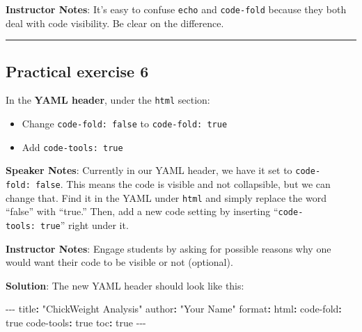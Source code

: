 \documentclass[
  letterpaper,
  DIV=11,
  numbers=noendperiod]{scrartcl}
\newenvironment{Shaded}{\begin{snugshade}}{\end{snugshade}}
\newcommand{\AttributeTok}[1]{\textcolor[rgb]{0.40,0.45,0.13}{#1}}
\newcommand{\CharTok}[1]{\textcolor[rgb]{0.13,0.47,0.30}{#1}}
\newcommand{\FunctionTok}[1]{\textcolor[rgb]{0.28,0.35,0.67}{#1}}
\newcommand{\KeywordTok}[1]{\textcolor[rgb]{0.00,0.23,0.31}{\textbf{#1}}}
\newcommand{\PreprocessorTok}[1]{\textcolor[rgb]{0.68,0.00,0.00}{#1}}
\newcommand{\StringTok}[1]{\textcolor[rgb]{0.13,0.47,0.30}{#1}}
\providecommand{\tightlist}{%
  \setlength{\itemsep}{0pt}\setlength{\parskip}{0pt}}
\begin{document}
\textbf{Instructor Notes}: It's easy to confuse \texttt{echo} and
\texttt{code-fold} because they both deal with code visibility. Be clear
on the difference.

\begin{center}\rule{0.5\linewidth}{0.5pt}\end{center}

\subsection{Practical exercise 6}\label{practical-exercise-6}

In the \textbf{YAML header}, under the \texttt{html} section:

\begin{itemize}
\tightlist
\item[$\square$]
  Change \texttt{code-fold:\ false} to \texttt{code-fold:\ true}
\item[$\square$]
  Add \texttt{code-tools:\ true}
\end{itemize}

\textbf{Speaker Notes}: Currently in our YAML header, we have it set to
\texttt{code-fold:\ false}. This means the code is visible and not
collapsible, but we can change that. Find it in the YAML under
\texttt{html} and simply replace the word ``false'' with ``true.'' Then,
add a new code setting by inserting ``\texttt{code-tools:\ true}'' right
under it.

\textbf{Instructor Notes}: Engage students by asking for possible
reasons why one would want their code to be visible or not (optional).

\textbf{Solution}: The new YAML header should look like this:

\begin{Shaded}
\begin{Highlighting}[]
\PreprocessorTok{{-}{-}{-}}
\FunctionTok{title}\KeywordTok{:}\AttributeTok{ }\StringTok{"ChickWeight Analysis"}
\FunctionTok{author}\KeywordTok{:}\AttributeTok{ }\StringTok{"Your Name"}
\FunctionTok{format}\KeywordTok{:}
\AttributeTok{  }\FunctionTok{html}\KeywordTok{:}
\AttributeTok{    }\FunctionTok{code{-}fold}\KeywordTok{:}\AttributeTok{ }\CharTok{true}
\AttributeTok{    }\FunctionTok{code{-}tools}\KeywordTok{:}\AttributeTok{ }\CharTok{true}
\AttributeTok{    }\FunctionTok{toc}\KeywordTok{:}\AttributeTok{ }\CharTok{true}
\PreprocessorTok{{-}{-}{-}}
\end{Highlighting}
\end{Shaded}
\end{document}

